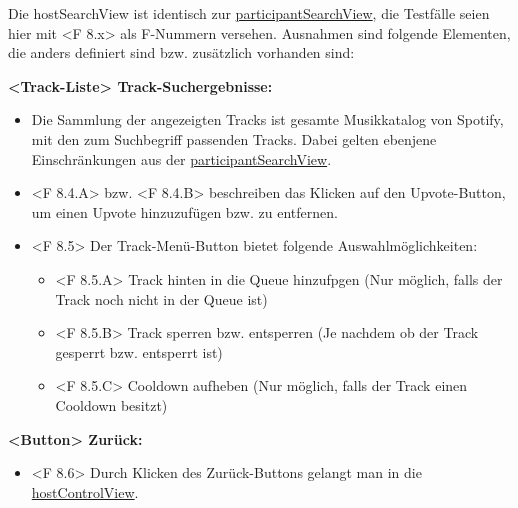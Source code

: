 \documentclass[oneside, ngerman]{sdqtechreport}
\begin{document}
Die hostSearchView ist identisch zur \hyperlink{participantSearchView}{participantSearchView}, die Testfälle seien hier mit <F 8.x> als F-Nummern versehen. Ausnahmen sind folgende Elementen, die anders definiert sind bzw. zusätzlich vorhanden sind:

\textbf{<Track-Liste> Track-Suchergebnisse:}
\begin{itemize}
    \item Die Sammlung der angezeigten Tracks ist gesamte Musikkatalog von Spotify, mit den zum Suchbegriff passenden Tracks. Dabei gelten ebenjene Einschränkungen aus der \hyperlink{participantSearchView}{participantSearchView}.
    \hypertarget{<F 8.4.A>}{}
    \hypertarget{<F 8.4.B>}{}
    \item <F 8.4.A> bzw. <F 8.4.B> beschreiben das Klicken auf den Upvote-Button, um einen Upvote hinzuzufügen bzw. zu entfernen.
    \hypertarget{<F 8.5>}{}
    \item <F 8.5> Der Track-Menü-Button bietet folgende Auswahlmöglichkeiten:
    \begin{itemize}
    \hypertarget{ <F 8.5.A>}{}
        \item <F 8.5.A> Track hinten in die Queue hinzufpgen (Nur möglich, falls der Track noch nicht in der Queue ist)
        \hypertarget{<F 8.5.B>}{}
        \item <F 8.5.B> Track sperren bzw. entsperren (Je nachdem ob der Track gesperrt bzw. entsperrt ist)
        \hypertarget{<F 8.5.C>}{}
        \item <F 8.5.C> Cooldown aufheben (Nur möglich, falls der Track einen Cooldown besitzt)
    \end{itemize}
\end{itemize}

\textbf{<Button> Zurück:}
\begin{itemize}
    \hypertarget{<F 8.6>}{}
    \item <F 8.6> Durch Klicken des Zurück-Buttons gelangt man in die  \hyperlink{hostControlView}{hostControlView}.
\end{itemize}
\end{document}
